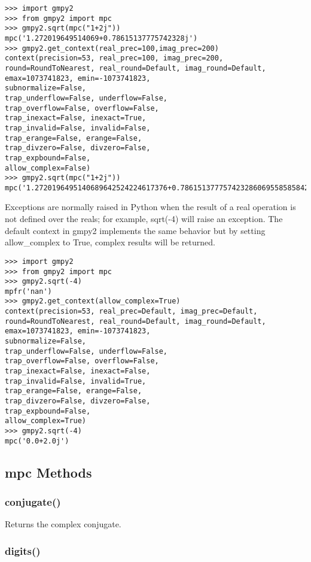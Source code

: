 \begin{lstlisting}
>>> import gmpy2
>>> from gmpy2 import mpc
>>> gmpy2.sqrt(mpc("1+2j"))
mpc('1.272019649514069+0.78615137775742328j')
>>> gmpy2.get_context(real_prec=100,imag_prec=200)
context(precision=53, real_prec=100, imag_prec=200,
round=RoundToNearest, real_round=Default, imag_round=Default,
emax=1073741823, emin=-1073741823,
subnormalize=False,
trap_underflow=False, underflow=False,
trap_overflow=False, overflow=False,
trap_inexact=False, inexact=True,
trap_invalid=False, invalid=False,
trap_erange=False, erange=False,
trap_divzero=False, divzero=False,
trap_expbound=False,
allow_complex=False)
>>> gmpy2.sqrt(mpc("1+2j"))
mpc('1.2720196495140689642524224617376+0.7861513777574232860695585858429589295231220
\end{lstlisting}

Exceptions are normally raised in Python when the result of a real operation is not defined
over the reals; for example, sqrt(-4) will raise an exception. The default context in gmpy2
implements the same behavior but by setting allow\_complex to True, complex results will be
returned.

\begin{lstlisting}
>>> import gmpy2
>>> from gmpy2 import mpc
>>> gmpy2.sqrt(-4)
mpfr('nan')
>>> gmpy2.get_context(allow_complex=True)
context(precision=53, real_prec=Default, imag_prec=Default,
round=RoundToNearest, real_round=Default, imag_round=Default,
emax=1073741823, emin=-1073741823,
subnormalize=False,
trap_underflow=False, underflow=False,
trap_overflow=False, overflow=False,
trap_inexact=False, inexact=False,
trap_invalid=False, invalid=True,
trap_erange=False, erange=False,
trap_divzero=False, divzero=False,
trap_expbound=False,
allow_complex=True)
>>> gmpy2.sqrt(-4)
mpc('0.0+2.0j')
\end{lstlisting}


\subsection{mpc Methods}

\subsubsection{conjugate()}

Returns the complex conjugate.

\subsubsection{digits()}

